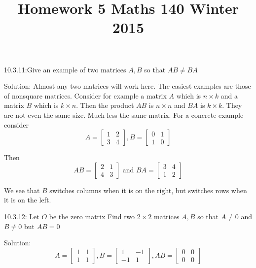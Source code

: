 \documentclass[16 pt]{amsart}
\theoremstyle{definition}
\theoremstyle{remark}
\numberwithin{equation}{subsection}
\begin{document}
\title{Homework 5 Maths 140 Winter 2015}
\maketitle 

10.3.11:Give an example of two matrices $A,B$ so that $AB \neq BA$

\vspace{1in}

Solution: Almost any two matrices will work here.  The easiest examples are those of nonsquare matrices.  Consider for example a matrix $A$ which is $n\times k$ and a matrix $B$ which is $k\times n$. Then the product $AB$ is $n\times n$ and $BA$ is $k\times k$.  They are not even the same size.  Much less the same matrix.  For a concrete example consider
\[
A = \begin{bmatrix}
1 & 2 \\ 3& 4
\end{bmatrix}
, B = \begin{bmatrix}
0 & 1 \\ 1 & 0
\end{bmatrix}
\]

Then 
\[
AB = \begin{bmatrix}
2 & 1 \\ 4 & 3
\end{bmatrix} 
\text{ and } 
BA = \begin{bmatrix}
3 & 4 \\ 1 & 2
\end{bmatrix}
\]

We see that $B$ switches columns when it is on the right, but switches rows when it is on the left.

\newpage

10.3.12: Let $O$ be the zero matrix Find two $2\times 2$ matrices $A,B$ so that $A\neq 0$ and $B\neq 0$ but $AB=0$



\vspace{1in}

Solution:
\[
A = \begin{bmatrix}
1 & 1 \\ 1 & 1
\end{bmatrix},
B = \begin{bmatrix}
1 & -1 \\ -1 & 1
\end{bmatrix},
AB = \begin{bmatrix}
0 & 0 \\0 & 0
\end{bmatrix}
\]
\end{document}
